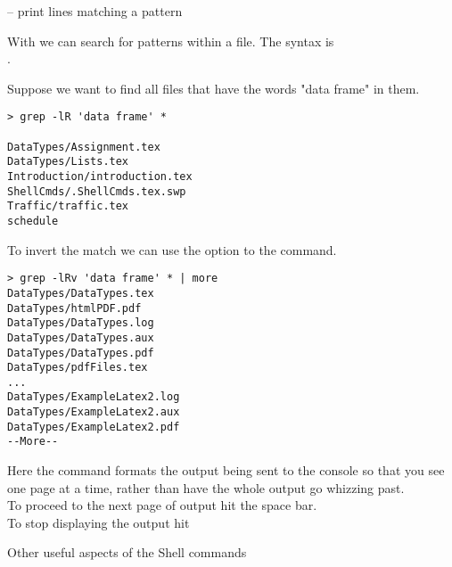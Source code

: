{ -- print lines matching a pattern}

With  we can search for patterns within a file.
The syntax is\\
.

Suppose we want to find all files that have the words "data frame"
in them.
\begin{verbatim}
> grep -lR 'data frame' *

DataTypes/Assignment.tex
DataTypes/Lists.tex
Introduction/introduction.tex
ShellCmds/.ShellCmds.tex.swp
Traffic/traffic.tex
schedule
\end{verbatim}


To invert the match we can use the  option
to the  command. 

\begin{verbatim}
> grep -lRv 'data frame' * | more
DataTypes/DataTypes.tex
DataTypes/htmlPDF.pdf
DataTypes/DataTypes.log
DataTypes/DataTypes.aux
DataTypes/DataTypes.pdf
DataTypes/pdfFiles.tex
...
DataTypes/ExampleLatex2.log
DataTypes/ExampleLatex2.aux
DataTypes/ExampleLatex2.pdf
--More--
\end{verbatim}

Here the  command formats the output being sent to the 
console so that you see one page at a time, rather than have the 
whole output go whizzing past.
\\
To proceed to the next page of output hit the space bar.
\\
To stop displaying the output hit  

{Other useful aspects of the Shell commands}

